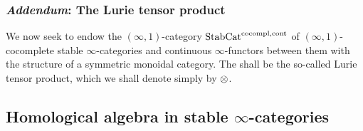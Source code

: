        \subsubsection{\textit{Addendum}: The Lurie tensor product}
            We now seek to endow the $(\infty, 1)$-category $\mathrm{Stab}\mathrm{Cat}^{\mathrm{co}\mathrm{compl}, \mathrm{cont}}$ of $(\infty, 1)$-cocomplete stable $\infty$-categories and continuous $\infty$-functors between them with the structure of a symmetric monoidal category. The  shall be the so-called Lurie tensor product, which we shall denote simply by $\tensor$. 

    \subsection{Homological algebra in stable \texorpdfstring{$\infty$}{}-categories}
